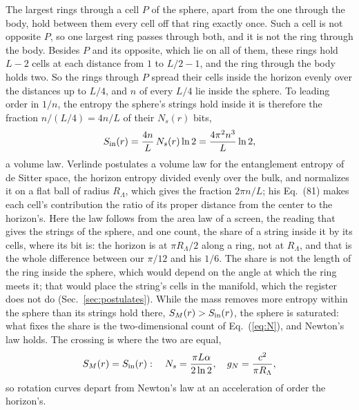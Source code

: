 \documentclass[aps,prd,twocolumn,superscriptaddress,nofootinbib,showkeys]{revtex4-2}
\newcommand{\RL}{R_\Lambda}
\begin{document}
The largest rings through a cell $P$ of the sphere, apart from the one through the body, hold between them every cell off that ring exactly once. Such a cell is not opposite $P$, so one largest ring passes through both, and it is not the ring through the body. Besides $P$ and its opposite, which lie on all of them, these rings hold $L-2$ cells at each distance from $1$ to $L/2-1$, and the ring through the body holds two. So the rings through $P$ spread their cells inside the horizon evenly over the distances up to $L/4$, and $n$ of every $L/4$ lie inside the sphere. To leading order in $1/n$, the entropy the sphere's strings hold inside it is therefore the fraction $n/(L/4) = 4n/L$ of their $N_s(r)$ bits,
\begin{equation}
S_{\rm in}(r) = \frac{4n}{L}\,N_s(r)\ln2 = \frac{4\pi^2 n^3}{L}\ln2 ,
\label{eq:volume}
\end{equation}
a volume law. Verlinde postulates a volume law for the entanglement entropy of de Sitter space, the horizon entropy divided evenly over the bulk, and normalizes it on a flat ball of radius $\RL$, which gives the fraction $2\pi n/L$; his Eq.~(81) makes each cell's contribution the ratio of its proper distance from the center to the horizon's. Here the law follows from the area law of a screen, the reading that gives the strings of the sphere, and one count, the share of a string inside it by its cells, where its bit is: the horizon is at $\pi\RL/2$ along a ring, not at $\RL$, and that is the whole difference between our $\pi/12$ and his $1/6$. The share is not the length of the ring inside the sphere, which would depend on the angle at which the ring meets it; that would place the string's cells in the manifold, which the register does not do (Sec.~\ref{sec:postulates}). While the mass removes more entropy within the sphere than its strings hold there, $S_M(r) > S_{\rm in}(r)$, the sphere is saturated: what fixes the share is the two-dimensional count of Eq.~(\ref{eq:N}), and Newton's law holds. The crossing is where the two are equal,
\begin{equation}
S_M(r) = S_{\rm in}(r): \quad N_s = \frac{\pi L\alpha}{2\ln2}, \quad g_N = \frac{c^2}{\pi\RL} ,
\label{eq:criterion}
\end{equation}
so rotation curves depart from Newton's law at an acceleration of order the horizon's.
\end{document}
